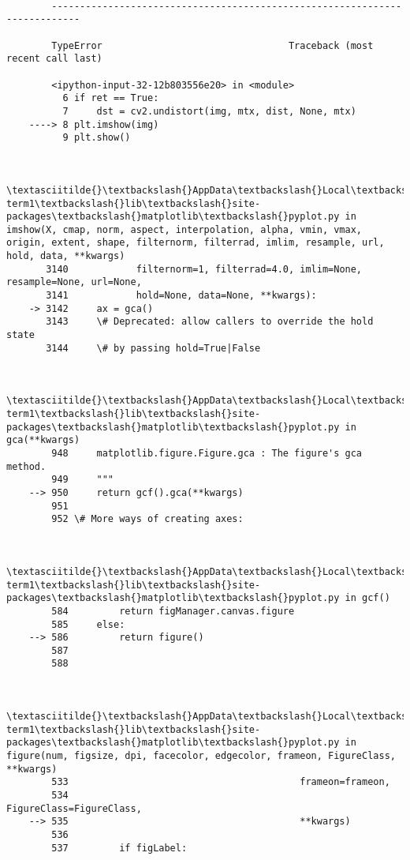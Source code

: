 \documentclass[11pt]{article}
\begin{document}
    \begin{Verbatim}[commandchars=\\\{\}]

        ---------------------------------------------------------------------------

        TypeError                                 Traceback (most recent call last)

        <ipython-input-32-12b803556e20> in <module>
          6 if ret == True:
          7     dst = cv2.undistort(img, mtx, dist, None, mtx)
    ----> 8 plt.imshow(img)
          9 plt.show()
    

        \textasciitilde{}\textbackslash{}AppData\textbackslash{}Local\textbackslash{}Continuum\textbackslash{}miniconda3\textbackslash{}envs\textbackslash{}carnd-term1\textbackslash{}lib\textbackslash{}site-packages\textbackslash{}matplotlib\textbackslash{}pyplot.py in imshow(X, cmap, norm, aspect, interpolation, alpha, vmin, vmax, origin, extent, shape, filternorm, filterrad, imlim, resample, url, hold, data, **kwargs)
       3140            filternorm=1, filterrad=4.0, imlim=None, resample=None, url=None,
       3141            hold=None, data=None, **kwargs):
    -> 3142     ax = gca()
       3143     \# Deprecated: allow callers to override the hold state
       3144     \# by passing hold=True|False
    

        \textasciitilde{}\textbackslash{}AppData\textbackslash{}Local\textbackslash{}Continuum\textbackslash{}miniconda3\textbackslash{}envs\textbackslash{}carnd-term1\textbackslash{}lib\textbackslash{}site-packages\textbackslash{}matplotlib\textbackslash{}pyplot.py in gca(**kwargs)
        948     matplotlib.figure.Figure.gca : The figure's gca method.
        949     """
    --> 950     return gcf().gca(**kwargs)
        951 
        952 \# More ways of creating axes:
    

        \textasciitilde{}\textbackslash{}AppData\textbackslash{}Local\textbackslash{}Continuum\textbackslash{}miniconda3\textbackslash{}envs\textbackslash{}carnd-term1\textbackslash{}lib\textbackslash{}site-packages\textbackslash{}matplotlib\textbackslash{}pyplot.py in gcf()
        584         return figManager.canvas.figure
        585     else:
    --> 586         return figure()
        587 
        588 
    

        \textasciitilde{}\textbackslash{}AppData\textbackslash{}Local\textbackslash{}Continuum\textbackslash{}miniconda3\textbackslash{}envs\textbackslash{}carnd-term1\textbackslash{}lib\textbackslash{}site-packages\textbackslash{}matplotlib\textbackslash{}pyplot.py in figure(num, figsize, dpi, facecolor, edgecolor, frameon, FigureClass, **kwargs)
        533                                         frameon=frameon,
        534                                         FigureClass=FigureClass,
    --> 535                                         **kwargs)
        536 
        537         if figLabel:
    


\end{Verbatim}
\end{document}
